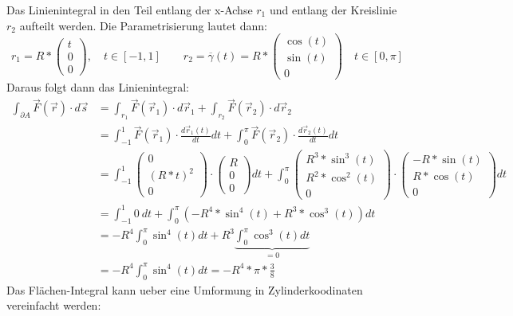 \documentclass[a4paper]{article}
\begin{document}
Das Linienintegral in den Teil entlang der x-Achse $r_1$ und entlang der Kreislinie $r_2$ aufteilt werden. Die Parametrisierung lautet dann:
\[
	r_1 = R * \begin{pmatrix} t \\ 0 \\ 0 \end{pmatrix}, \quad 
	t \in [-1, 1] \qquad 
	r_2 = \overline \gamma (t) = R *
		\begin{pmatrix}
			\cos(t) \\ \sin(t) \\ 0
		\end{pmatrix}
		\quad
	t \in [0, \pi ]
\]
Daraus folgt dann das Linienintegral:
\begin{align*}
	\int_{\partial A} \vec F (\vec r ) \cdot d\vec s
	&= \int_{r_1} \vec F (\vec r_1 ) \cdot d\vec r_1 +
	\int_{r_2} \vec F (\vec r_2 ) \cdot d\vec r_2 \\
	&= \int_{-1}^1 \vec F (\vec r_1 ) \cdot \frac{d\vec r_1(t)}{dt} dt +
	\int_0^\pi \vec F (\vec r_2 ) \cdot \frac{d\vec r_2(t)}{dt} dt \\
	&= \int_{-1}^1
	\begin{pmatrix} 0 \\ (R*t)^2 \\ 0 \end{pmatrix}
	\cdot
	\begin{pmatrix} R \\ 0 \\ 0 \end{pmatrix}
	dt + 
	\int_0^\pi
	\begin{pmatrix} R^3 * \sin^3(t) \\ R^2 * \cos^2(t) \\ 0 \end{pmatrix}
	\cdot
	\begin{pmatrix} -R*\sin(t) \\ R*\cos(t) \\ 0 \end{pmatrix}
	dt \\
	&= \int_{-1}^1 0 \ dt + 
	\int_0^\pi
	\left(
	-R^4 * \sin^4(t) + R^3 * \cos^3(t)
	\right)
	dt \\
	&= -R^4 \int_0^\pi \sin^4(t) dt + 
	R^3 \underbrace{\int_0^\pi \cos^3(t) dt }_{= 0} \\
	&= -R^4 \int_0^\pi \sin^4(t) dt = -R^4 * \pi * \frac 3 8
\end{align*}
Das Flächen-Integral kann ueber eine Umformung in Zylinderkoodinaten vereinfacht werden:
\end{document}
